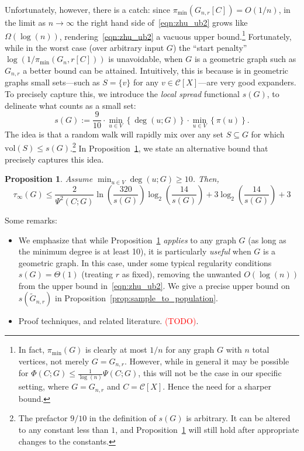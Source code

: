 \documentclass{article}
\newcommand{\set}[1]{\left\{#1\right\}}
\newcommand{\vol}{\mathrm{vol}}
\newcommand{\1}{\mathbf{1}}
\newcommand{\mc}[1]{\mathcal{#1}}
\newcommand{\wt}[1]{\widetilde{#1}}
\theoremstyle{alden}
\theoremstyle{aldenthm}
\newtheorem{proposition}{Proposition}
\theoremstyle{definition}
\theoremstyle{remark}
\begin{document}
Unfortunately, however, there is a catch: since $\pi_{\min}(G_{n,r}[C]) = O(1/n)$, in the limit as $n \to \infty$ the right hand side of~\eqref{eqn:zhu_ub2} grows like $\Omega(\log(n))$, rendering~\eqref{eqn:zhu_ub2} a vacuous upper bound.\footnote{In fact, $\pi_{\min}(G)$ is clearly at most $1/n$ for any graph $G$ with $n$ total vertices, not merely $G = G_{n,r}$. However, while in general it may be possible for $\Phi(C;G) \leq \frac{1}{\log(n)} \Psi(C;G)$, this will not be the case in our specific setting, where $G = G_{n,r}$ and $C = \mc{C}[X]$. Hence the need for a sharper bound.} Fortunately, while in the worst  case (over arbitrary input $G$) the ``start penalty'' $\log(1/\pi_{\min}(G_n,r[C]))$ is unavoidable, when $G$ is a geometric graph such as $G_{n,r}$ a better bound can be attained. Intuitively, this is because is in geometric graphs small sets---such as $S = \{v\}$ for any $v \in \mc{C}[X]$---are very good expanders. To precisely capture this, we introduce the \emph{local spread} functional $s(G)$, to delineate what counts as a small set:
\begin{equation*}
s(G) := \frac{9}{10} \cdot \min_{u \in V} \set{\deg(u; G)} \cdot \min_{u \in V} \set{\pi(u)}.
\end{equation*}
The idea is that a random walk will rapidly mix over any set $S \subseteq G$ for which $\vol(S) \leq s(G)$.\footnote{The prefactor $9/10$ in the definition of $s(G)$ is arbitrary. It can be altered to any constant less than $1$, and Proposition~\ref{prop:pointwise_mixing_time} will still hold after appropriate changes to the constants.} In Proposition~\ref{prop:pointwise_mixing_time}, we state an alternative bound that precisely captures this idea.
\begin{proposition}
	\label{prop:pointwise_mixing_time}
	Assume $\min_{u \in V} \deg(u; G) \geq 10$. Then,
	\begin{equation*}
	\tau_{\infty}(G) \leq \frac{2}{\Psi^2(C; G)} \ln \left(\frac{320}{s(G)}\right)\log_2 \left(\frac{14}{s(G)}\right)  + 3 \log_2 \left(\frac{14}{s(G)}\right) + 3
	\end{equation*}
\end{proposition}
Some remarks:
\begin{itemize}
	\item We emphasize that while Proposition~\ref{prop:pointwise_mixing_time} \emph{applies} to any graph $G$ (as long as the minimum degree is at least 10), it is particularly \emph{useful} when $G$ is a geometric graph. In this case, under some typical regularity conditions $s(G) = \Theta(1)$ (treating $r$ as fixed), removing the unwanted $O(\log(n))$ from the upper bound in~\eqref{eqn:zhu_ub2}. We give a precise upper bound on $s(\wt{G}_{n,r})$ in Proposition~\ref{prop:sample_to_population}.
	\item Proof techniques, and related literature. \textcolor{red}{(TODO)}.
\end{itemize}
\end{document}

